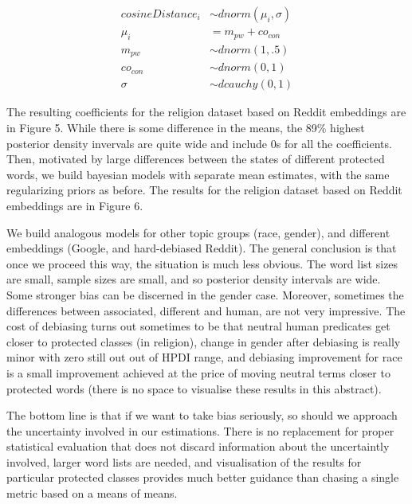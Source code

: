 \documentclass[
  12pt,
  dvipsnames,enabledeprecatedfontcommands]{scrartcl}
\begin{document}
\footnotesize

\vspace{-5mm}

\begin{align}
cosineDistance_i  & \sim dnorm(\mu_i, \sigma) \\
\mu_i & = m_{pw} + co_{con}\\
m_{pw} & \sim dnorm(1,.5) \\
co_{con} & \sim dnorm(0,1) \\
\sigma &\sim  dcauchy(0,1)
\end{align} \normalsize 

The resulting coefficients for the religion dataset based on Reddit
embeddings are in Figure 5. While there is some difference in the means,
the 89\% highest posterior density invervals are quite wide and include
0s for all the coefficients. Then, motivated by large differences
between the states of different protected words, we build bayesian
models with separate mean estimates, with the same regularizing priors
as before. The results for the religion dataset based on Reddit
embeddings are in Figure 6.

We build analogous models for other topic groups (race, gender), and
different embeddings (Google, and hard-debiased Reddit). The general
conclusion is that once we proceed this way, the situation is much less
obvious. The word list sizes are small, sample sizes are small, and so
posterior density intervals are wide. Some stronger bias can be
discerned in the gender case. Moreover, sometimes the differences
between associated, different and human, are not very impressive. The
cost of debiasing turns out sometimes to be that neutral human
predicates get closer to protected classes (in religion), change in
gender after debiasing is really minor with zero still out out of HPDI
range, and debiasing improvement for race is a small improvement
achieved at the price of moving neutral terms closer to protected words
(there is no space to visualise these results in this abstract).

The bottom line is that if we want to take bias seriously, so should we
approach the uncertainty involved in our estimations. There is no
replacement for proper statistical evaluation that does not discard
information about the uncertaintly involved, larger word lists are
needed, and visualisation of the results for particular protected
classes provides much better guidance than chasing a single metric based
on a means of means.

\pagebreak
\end{document}
